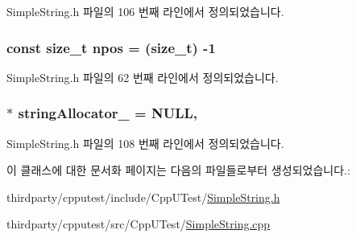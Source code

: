 Simple\+String.\+h 파일의 106 번째 라인에서 정의되었습니다.

\subsubsection[{\texorpdfstring{npos}{npos}}]{\setlength{\rightskip}{0pt plus 5cm}const size\+\_\+t npos = (size\+\_\+t) -\/1\hspace{0.3cm}{\ttfamily [static]}}\hypertarget{class_simple_string_a03aff983f503a71029aecb707175b2ed}{}\label{class_simple_string_a03aff983f503a71029aecb707175b2ed}


Simple\+String.\+h 파일의 62 번째 라인에서 정의되었습니다.

\subsubsection[{\texorpdfstring{string\+Allocator\+\_\+}{stringAllocator_}}]{ $\ast$ string\+Allocator\+\_\+ = {\bf N\+U\+LL}\hspace{0.3cm}{\ttfamily [static]}, {\ttfamily [private]}}\hypertarget{class_simple_string_aa6bb63164af4af1bf62e59b19e14d4be}{}\label{class_simple_string_aa6bb63164af4af1bf62e59b19e14d4be}


Simple\+String.\+h 파일의 108 번째 라인에서 정의되었습니다.



이 클래스에 대한 문서화 페이지는 다음의 파일들로부터 생성되었습니다.\+:\begin{DoxyCompactItemize}
\item 
thirdparty/cpputest/include/\+Cpp\+U\+Test/\hyperlink{_simple_string_8h}{Simple\+String.\+h}\item 
thirdparty/cpputest/src/\+Cpp\+U\+Test/\hyperlink{_simple_string_8cpp}{Simple\+String.\+cpp}\end{DoxyCompactItemize}
